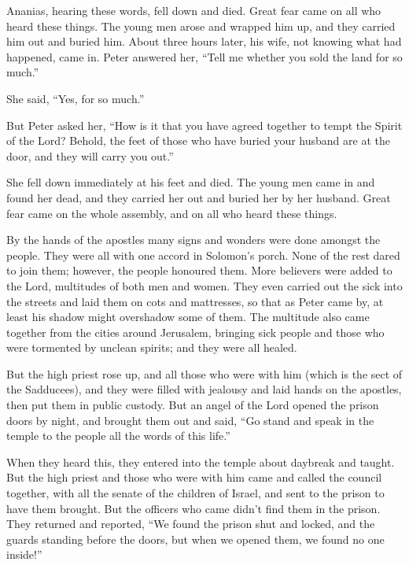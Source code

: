  Ananias, hearing these words, fell down and died. Great
fear came on all who heard these things.  The young men
arose and wrapped him up, and they carried him out and buried him.
 About three hours later, his wife, not knowing what had
happened, came in.  Peter answered her, ``Tell me whether
you sold the land for so much.''

She said, ``Yes, for so much.''

 But Peter asked her, ``How is it that you have agreed
together to tempt the Spirit of the Lord? Behold, the feet of those who
have buried your husband are at the door, and they will carry you out.''

 She fell down immediately at his feet and died. The
young men came in and found her dead, and they carried her out and
buried her by her husband.  Great fear came on the whole
assembly, and on all who heard these things.

 By the hands of the apostles many signs and wonders were
done amongst the people. They were all with one accord in Solomon's
porch.  None of the rest dared to join them; however, the
people honoured them.  More believers were added to the
Lord, multitudes of both men and women.  They even
carried out the sick into the streets and laid them on cots and
mattresses, so that as Peter came by, at least his shadow might
overshadow some of them.  The multitude also came
together from the cities around Jerusalem, bringing sick people and
those who were tormented by unclean spirits; and they were all healed.

 But the high priest rose up, and all those who were with
him (which is the sect of the Sadducees), and they were filled with
jealousy  and laid hands on the apostles, then put them
in public custody.  But an angel of the Lord opened the
prison doors by night, and brought them out and said, 
``Go stand and speak in the temple to the people all the words of this
life.''

 When they heard this, they entered into the temple about
daybreak and taught. But the high priest and those who were with him
came and called the council together, with all the senate of the
children of Israel, and sent to the prison to have them brought.
 But the officers who came didn't find them in the
prison. They returned and reported,  ``We found the
prison shut and locked, and the guards standing before the doors, but
when we opened them, we found no one inside!''

